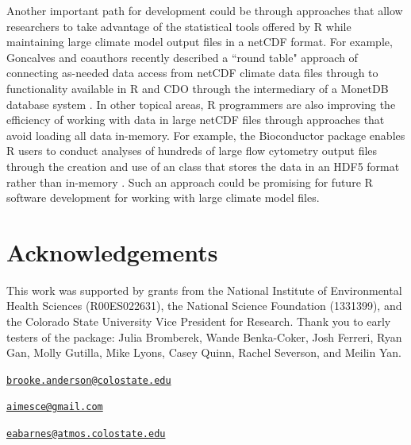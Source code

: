 Another important path for development could be through approaches that
allow researchers to take advantage of the statistical tools offered by
R while maintaining large climate model output files in a netCDF format.
For example, Goncalves and coauthors recently described a ``round table"
approach of connecting as-needed data access from netCDF climate data
files through to functionality available in R and CDO through the
intermediary of a MonetDB database system \citep{goncalves2015round}. In
other topical areas, R programmers are also improving the efficiency of
working with data in large netCDF files through approaches that avoid
loading all data in-memory. For example, the Bioconductor package
 enables R users to conduct analyses of hundreds of large
flow cytometry output files through the creation and use of an
 class that stores the data in an HDF5 format rather
than in-memory \citep{ncdfFlow, finak2014opencyto}. Such an approach
could be promising for future R software development for working with
large climate model files.

\section{Acknowledgements}\label{acknowledgements}

This work was supported by grants from the National Institute of
Environmental Health Sciences (R00ES022631), the National Science
Foundation (1331399), and the Colorado State University Vice President
for Research. Thank you to early testers of the package: Julia
Bromberek, Wande Benka-Coker, Josh Ferreri, Ryan Gan, Molly Gutilla,
Mike Lyons, Casey Quinn, Rachel Severson, and Meilin Yan.



\address{%
G. Brooke Anderson\\
Colorado State University\\
Department of Environmental \& Radiological Health Sciences\\ 1681 Campus Delivery\\ Fort Collins, Colorado 80523\\
}
\href{mailto:brooke.anderson@colostate.edu}{\nolinkurl{brooke.anderson@colostate.edu}}

\address{%
Colin Eason\\
Colorado State University\\
Department of Computer Science\\ 1873 Campus Delivery\\ Fort Collins, Colorado 80523\\
}
\href{mailto:aimesce@gmail.com}{\nolinkurl{aimesce@gmail.com}}

\address{%
Elizabeth A. Barnes\\
Colorado State University\\
Department of Atmospheric Science\\ 1371 Campus Delivery\\ Fort Collins, CO 80523\\
}
\href{mailto:eabarnes@atmos.colostate.edu}{\nolinkurl{eabarnes@atmos.colostate.edu}}

